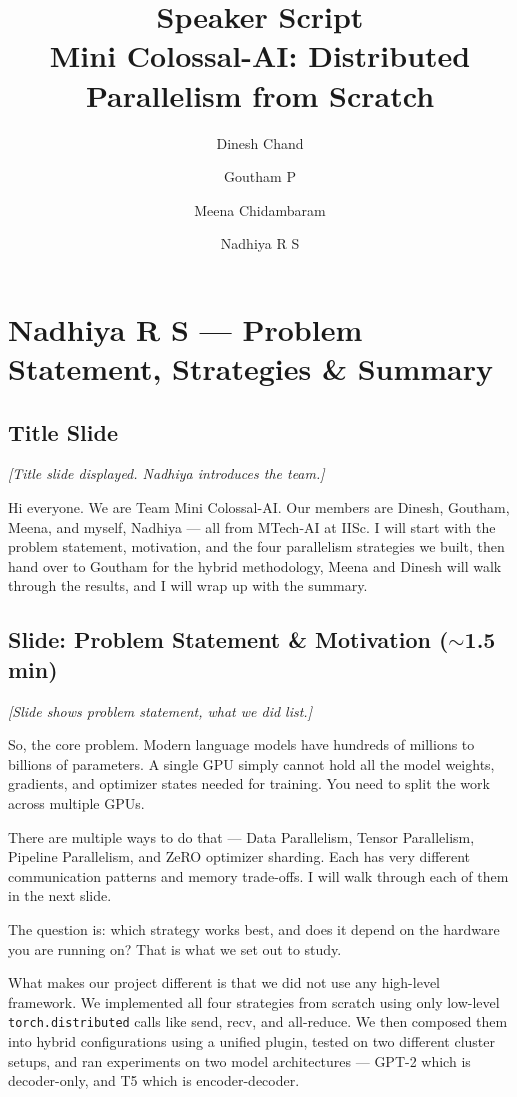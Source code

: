 \documentclass[11pt, a4paper]{article}
\title{Speaker Script\\[0.3em]\large Mini Colossal-AI: Distributed Parallelism from Scratch}
\author{Dinesh Chand \and Goutham P \and Meena Chidambaram \and Nadhiya R S}
\date{}
\begin{document}
\maketitle
\tableofcontents
\newpage

\section{Nadhiya R S --- Problem Statement, Strategies \& Summary}

\subsection{Title Slide}
\textit{[Title slide displayed. Nadhiya introduces the team.]}

Hi everyone. We are Team Mini Colossal-AI. Our members are Dinesh, Goutham, Meena, and myself, Nadhiya --- all from MTech-AI at IISc. I will start with the problem statement, motivation, and the four parallelism strategies we built, then hand over to Goutham for the hybrid methodology, Meena and Dinesh will walk through the results, and I will wrap up with the summary.

\subsection{Slide: Problem Statement \& Motivation ($\sim$1.5 min)}
\textit{[Slide shows problem statement, what we did list.]}

So, the core problem. Modern language models have hundreds of millions to billions of parameters. A single GPU simply cannot hold all the model weights, gradients, and optimizer states needed for training. You need to split the work across multiple GPUs.

There are multiple ways to do that --- Data Parallelism, Tensor Parallelism, Pipeline Parallelism, and ZeRO optimizer sharding. Each has very different communication patterns and memory trade-offs. I will walk through each of them in the next slide.

The question is: which strategy works best, and does it depend on the hardware you are running on? That is what we set out to study.

What makes our project different is that we did not use any high-level framework. We implemented all four strategies from scratch using only low-level \texttt{torch.distributed} calls like send, recv, and all-reduce. We then composed them into hybrid configurations using a unified plugin, tested on two different cluster setups, and ran experiments on two model architectures --- GPT-2 which is decoder-only, and T5 which is encoder-decoder.
\end{document}
